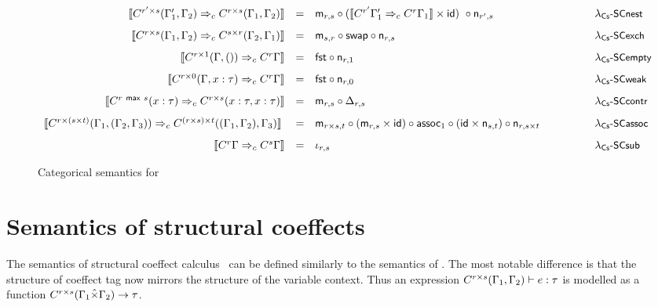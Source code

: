 \begin{figure*}[t]
\begin{equation*}
\begin{array}{rclll}
\cosem{\ctxtrans{\ctyp{r'\cprd s}{(\Gamma_1', \Gamma_2)}}{\ctyp{r \cprd s}{(\Gamma_1, \Gamma_2)}}}
&=& \cmerge_{r, s} \circ (\cosem{\ctxtrans{\ctyp{r'}{\Gamma_1'}}{\ctyp{r}{\Gamma_1}}} \times \ident{id})~\circ \csplit_{r', s}\quad&\quad\quad\quad& %
\textnormal{\rulessc{nest}}
\\[0.8em]
\cosem{\ctxtrans{\ctyp{r\cprd s}{(\Gamma_1, \Gamma_2)} }{ \ctyp{s\cprd r}{(\Gamma_2, \Gamma_1)}}}
&=& \cmerge_{s, r} \circ \ident{swap} \circ \csplit_{r, s}&&
\textnormal{\rulessc{exch}}
\\[0.8em]
\cosem{\ctxtrans{\ctyp{r \cprd 1}{(\Gamma, ())}}{\ctyp{r}{\Gamma}}}
&=&\ident{fst} \circ \csplit_{r, 1}&&
\textnormal{\rulessc{empty}}
\\[0.8em]
\cosem{\ctxtrans{ \ctyp{r\cprd 0}{(\Gamma, x:\tau)} }{ \ctyp{r}{\Gamma}}}
&=&\ident{fst} \circ \csplit_{r, 0}&&
\textnormal{\rulessc{weak}}
\\[0.8em]
\cosem{\ctxtrans{\ctyp{r \cvop s}{(x:\tau)}}{
    \ctyp{r \cprd s}{(x:\tau, x:\tau)}}}
&=&\cmerge_{r, s} \circ \cdupl_{r, s}&&
\textnormal{\rulessc{contr}}
\\[0.8em]
\cosem{\ctxtrans{\ctyp{r\cprd (s\cprd t)}{(\Gamma_1, (\Gamma_2, \Gamma_3))}}{
    \ctyp{(r\cprd s)\cprd t}{((\Gamma_1, \Gamma_2), \Gamma_3)}}}\;
&=& \cmerge_{r \cprd s, t} \circ (\cmerge_{r, s} \times \ident{id}) \circ \ident{assoc}_1 \circ
        (\ident{id} \times \csplit_{s, t}) \circ \csplit_{r, s \cprd t}&&
\textnormal{\rulessc{assoc}}
\\[0.8em]
\cosem{\ctxtrans{\ctyp{r}{\Gamma}}{\ctyp{s}{\Gamma}}}
&=&
\iota_{r, s}
&&
\textnormal{\rulessc{sub}}
\end{array}
\end{equation*}


\caption{Categorical semantics for~\clstr}
\label{fig:structural-semantics}
\vspace{-0.5em}
\end{figure*}



\section{Semantics of structural coeffects}
\label{sec:structural-semantics}

The semantics of structural coeffect calculus \clstr~can be defined similarly to the semantics of
\clflt. The most notable difference is that the structure of coeffect tag now mirrors the structure
of the variable context. Thus an expression $C^{r \times s}(\Gamma_1, \Gamma_2) \vdash e : \tau$ 
is modelled as a function $C^{r \times s}(\Gamma_1 \hat{\times} \Gamma_2) \rightarrow \tau$. 

